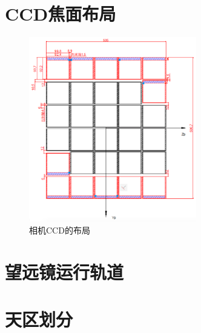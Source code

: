 \section{CCD焦面布局}

\begin{figure}[h!]
\centering
\includegraphics[width=0.65\textwidth]{figs/CCD.png}
\caption{相机CCD的布局}
\label{fig:ccd}
\end{figure}

\section{望远镜运行轨道}

\section{天区划分}
